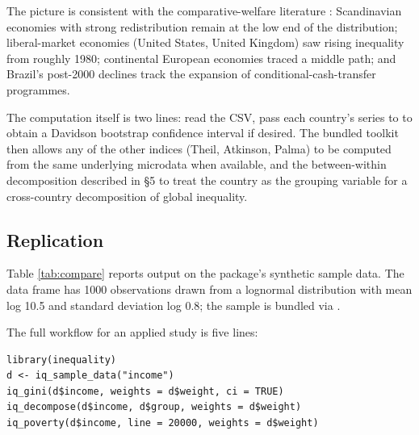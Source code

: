 The picture is consistent with the comparative-welfare literature
\citep{atkinson2008changing, piketty2014capital}: Scandinavian economies
with strong redistribution remain at the low end of the distribution;
liberal-market economies (United States, United Kingdom) saw rising
inequality from roughly 1980; continental European economies traced a
middle path; and Brazil's post-2000 declines track the expansion of
conditional-cash-transfer programmes.

The computation itself is two lines: read the CSV, pass each country's
series to  to obtain a Davidson bootstrap confidence
interval if desired. The bundled  toolkit then
allows any of the other indices (Theil, Atkinson, Palma) to be computed
from the same underlying microdata when available, and the
between-within decomposition described in §5 to treat the country as the
grouping variable for a cross-country decomposition of global
inequality.

\FloatBarrier

\subsection{Replication}\label{replication}

Table \ref{tab:compare} reports  output on the
package's synthetic sample data. The data frame has 1000 observations
drawn from a lognormal distribution with mean log 10.5 and standard
deviation log 0.8; the sample is bundled via
.

\begin{table}[!htbp]
\centering
\caption{\textbf{Nine inequality and poverty indices for the package's synthetic income sample.} Output of . Gini and Theil agree on the total magnitude; Atkinson rises sharply with inequality aversion; Palma ratio captures the 10/40 tail concentration; P90/P10 gives the most intuitive read.}
\label{tab:compare}

\end{table}

The full workflow for an applied study is five lines:

\begin{verbatim}
library(inequality)
d <- iq_sample_data("income")
iq_gini(d$income, weights = d$weight, ci = TRUE)
iq_decompose(d$income, d$group, weights = d$weight)
iq_poverty(d$income, line = 20000, weights = d$weight)
\end{verbatim}

